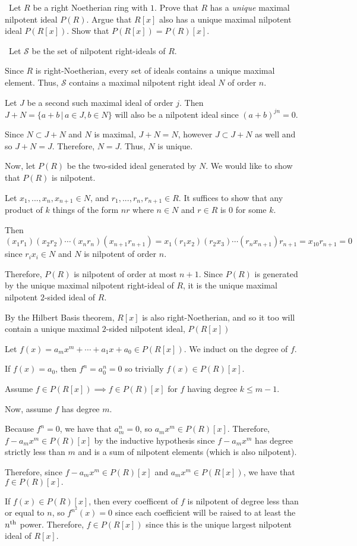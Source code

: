\documentclass[12pt]{Qual}
\begin{document}
\begin{problem} $\,$
Let $R$ be a right Noetherian ring with $1.$ Prove that $R$ has a \textit{unique} maximal nilpotent ideal $P(R)$. Argue that $R[x]$ also has a unique maximal nilpotent ideal $P(R[x])$. Show that $P(R[x])=P(R)[x].$
\end{problem}


\begin{solution}$\,$
Let $\mathscr{S}$ be the set of nilpotent right-ideals of $R$.

Since $R$ is right-Noetherian, every set of ideals contains a unique maximal element. Thus, $\mathscr{S}$ contains a maximal nilpotent right ideal $N$ of order $n.$

Let $J$ be a second such maximal ideal of order $j$. Then $J+N=\{a+b\,|\,a\in J, b\in N\}$ will also be a nilpotent ideal since $(a+b)^{jn}=0$.

Since $N\subset J+N$ and $N$ is maximal, $J+N=N$, however $J\subset J+N$ as well and so $J+N=J.$ Therefore, $N=J.$ Thus, $N$ is unique.

Now, let $P(R)$ be the two-sided ideal generated by $N.$ We would like to show that $P(R)$ is nilpotent.

Let $x_1,...,x_n,x_{n+1}\in N$, and $r_1,...,r_n,r_{n+1}\in R$. It suffices to show that any product of $k$ things of the form $nr$ where $n\in N$ and $r\in R$ is $0$ for some $k.$

Then $$(x_1r_1)(x_2r_2)\cdots(x_nr_n)(x_{n+1}r_{n+1})=x_1(r_1x_2)(r_2x_3)\cdots(r_nx_{n+1})r_{n+1}=x_10r_{n+1}=0$$ since $r_ix_i\in N$ and $N$ is nilpotent of order $n.$

Therefore, $P(R)$ is nilpotent of order at most $n+1.$ Since $P(R)$ is generated by the unique maximal nilpotent right-ideal of $R$, it is the unique maximal nilpotent $2$-sided ideal of $R.$

By the Hilbert Basis theorem, $R[x]$ is also right-Noetherian, and so it too will contain a unique maximal $2$-sided nilpotent ideal, $P(R[x])$

Let $f(x)=a_mx^m+\cdots+a_1x+a_0\in P(R[x]).$ We induct on the degree of $f.$

If $f(x)=a_0$, then $f^n=a_0^n=0$ so trivially $f(x)\in P(R)[x].$

Assume $f\in P(R[x])\implies f\in P(R)[x]$ for $f$ having degree $k\le m-1$.

Now, assume $f$ has degree $m$.

Because $f^n=0$, we have that $a_m^n=0$, so $a_mx^m\in P(R)[x]$. Therefore, $f-a_mx^m\in P(R)[x]$ by the inductive hypothesis since $f-a_mx^m$ has degree strictly less than $m$ and is a sum of nilpotent elements (which is also nilpotent).

Therefore, since $f-a_mx^m\in P(R)[x]$ and $a_mx^m\in P(R[x])$, we have that $f\in P(R)[x].$

If $f(x)\in P(R)[x]$, then every coefficent of $f$ is nilpotent of degree less than or equal to $n$, so $f^{n^2}(x)=0$ since each coefficient will be raised to at least the $n^\text{th}$ power. Therefore, $f\in P(R[x])$ since this is the unique largest nilpotent ideal of $R[x].$

\end{solution}
\newpage
\end{document}
